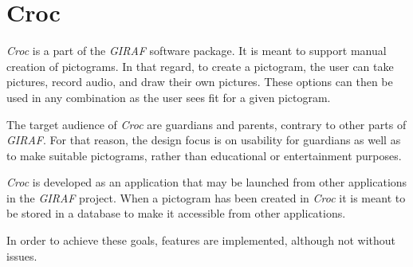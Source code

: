 \section{Croc}
\textit{Croc} is a part of the \textit{GIRAF} software package. 
It is meant to support manual creation of pictograms.
In that regard, to create a pictogram, the user can take pictures, record audio, and draw their own pictures.
These options can then be used in any combination as the user sees fit for a given pictogram.

The target audience of \textit{Croc} are guardians and parents, contrary to other parts of \textit{GIRAF}. 
For that reason, the design focus is on usability for guardians as well as to make suitable pictograms, rather than educational or entertainment purposes.

\textit{Croc} is developed as an application that may be launched from other applications in the \textit{GIRAF} project.
When a pictogram has been created in \textit{Croc} it is meant to be stored in a database to make it accessible from other applications.

In order to achieve these goals, features are implemented, although not without issues.
